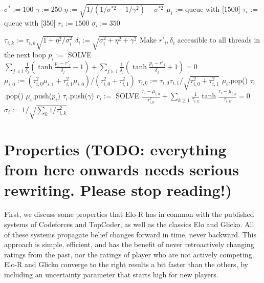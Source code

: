 \documentclass{article}
\begin{document}
\begin{algorithm}
\caption{$init()$}
\label{alg:init}
\begin{algorithmic}
\STATE $\sigma^* := 100$
\STATE $\gamma := 250$
\STATE $\eta := \sqrt{1 / \left( 1/\sigma^{*2} - 1/\gamma^2 \right) - \sigma^{*2}}$
\STATE $\mu_i$ := queue with [$1500$]
\STATE $\tau_i$ := queue with [$350$]
\STATE $r_i := 1500$
\STATE $\sigma_i := 350$
\ENDFOR
\end{algorithmic}
\end{algorithm}

\begin{algorithm}
\caption{$update()$}
\label{alg:update}
\begin{algorithmic}
\STATE $\tau_{i,k} := \tau_{i,k} \sqrt{1 + \eta^2/\sigma_i^2}$
\ENDFOR
\STATE $\delta_i := \sqrt{\sigma_i^2 + \eta^2 + \gamma^2}$
\STATE Make $r'_i,\delta_i$ accessible to all threads in the next loop
\ENDFOR
{}
\STATE $p_i := $ SOLVE $\sum_{j\preceq i}\frac{1}{\delta_j}\left( \tanh\frac {p_i - r'_j} {\delta_j} - 1 \right) + \sum_{j\succeq i}\frac{1}{\delta_j}\left( \tanh\frac {p_i - r'_j} {\delta_j} + 1 \right) = 0$
\STATE $\mu_{i,0} := \left( \tau_{i,0}^2 \mu_{i,1} + \tau_{i,1}^2 \mu_{i,0} \right) / \left( \tau_{i,0}^2 + \tau_{i,1}^2 \right)$
\STATE $\tau_{i,0} := \tau_{i,0}\tau_{i,1} / \sqrt{ \tau_{i,0}^2 + \tau_{i,1}^2 }$
\STATE $\mu_i$.pop()
\STATE $\tau_i$.pop()
\ENDIF
\STATE $\mu_i$.push($p_i$)
\STATE $\tau_i$.push($\gamma$)
\STATE $r_i := $ SOLVE $\frac{r_i-\mu_{i,0}}{\tau_{i,0}^2} + \sum_{k\ge 1} \frac{1}{\tau_{i,k}} \tanh \frac {r_i-\mu_{i,k}} {\tau_{i,k}} = 0$
\STATE $\sigma_i := 1 / \sqrt{\sum_k 1/\tau_{i,k}^2}$
\ENDFOR
\end{algorithmic}
\end{algorithm}

\section{Properties (TODO: everything from here onwards needs serious rewriting. Please stop reading!)}

First, we discuss some properties that Elo-R has in common with the published systems of Codeforces and TopCoder, as well as the classics Elo and Glicko. All of these systems propagate belief changes forward in time, never backward. This approach is simple, efficient, and has the benefit of never retroactively changing ratings from the past, nor the ratings of player who are not actively competing. Elo-R and Glicko converge to the right results a bit faster than the others, by including an uncertainty parameter that starts high for new players.
\end{document}
